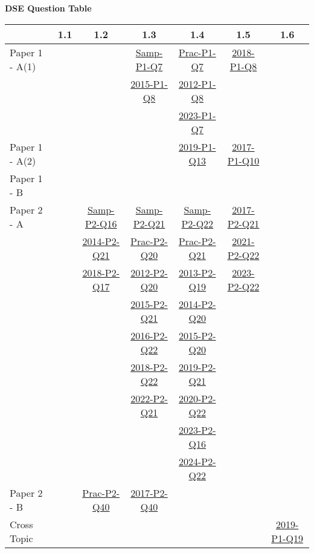 \documentclass[12pt, a4paper]{article}
\begin{document}
\begin{absolutelynopagebreak}
\begin{center}
\textbf{DSE Question Table}
\end{center}
\begin{center}
\begin{tabular}{|l|c|c|c|c|c|c|}
\hline
        & 1.1 & 1.2 & 1.3 & 1.4 & 1.5 & 1.6 \\\hline
\hline
Paper 1 - A(1)&  &  & \hyperref[DSE2012S-CoreP1-Q07]{Samp-P1-Q7} & \hyperref[DSE2012P-CoreP1-Q07]{Prac-P1-Q7} & \hyperref[DSE2018-CoreP1-Q08]{2018-P1-Q8} &  \\
&  &  & \hyperref[DSE2015-CoreP1-Q08]{2015-P1-Q8} & \hyperref[DSE2012-CoreP1-Q08]{2012-P1-Q8} &  &  \\
&  &  &  & \hyperref[DSE2023-CoreP1-Q07]{2023-P1-Q7} &  &  \\
\hline
Paper 1 - A(2)&  &  &  & \hyperref[DSE2019-CoreP1-Q13]{2019-P1-Q13} & \hyperref[DSE2017-CoreP1-Q10]{2017-P1-Q10} &  \\
\hline
Paper 1 - B&  &  &  &  &  &  \\
\hline
\hline
Paper 2 - A&  & \hyperref[DSE2012S-CoreP2-Q16]{Samp-P2-Q16} & \hyperref[DSE2012S-CoreP2-Q21]{Samp-P2-Q21} & \hyperref[DSE2012S-CoreP2-Q22]{Samp-P2-Q22} & \hyperref[DSE2017-CoreP2-Q21]{2017-P2-Q21} &  \\
&  & \hyperref[DSE2014-CoreP2-Q21]{2014-P2-Q21} & \hyperref[DSE2012P-CoreP2-Q20]{Prac-P2-Q20} & \hyperref[DSE2012P-CoreP2-Q21]{Prac-P2-Q21} & \hyperref[DSE2021-CoreP2-Q22]{2021-P2-Q22} &  \\
&  & \hyperref[DSE2018-CoreP2-Q17]{2018-P2-Q17} & \hyperref[DSE2012-CoreP2-Q20]{2012-P2-Q20} & \hyperref[DSE2013-CoreP2-Q19]{2013-P2-Q19} & \hyperref[DSE2023-CoreP2-Q22]{2023-P2-Q22} &  \\
&  &  & \hyperref[DSE2015-CoreP2-Q21]{2015-P2-Q21} & \hyperref[DSE2014-CoreP2-Q20]{2014-P2-Q20} &  &  \\
&  &  & \hyperref[DSE2016-CoreP2-Q22]{2016-P2-Q22} & \hyperref[DSE2015-CoreP2-Q20]{2015-P2-Q20} &  &  \\
&  &  & \hyperref[DSE2018-CoreP2-Q22]{2018-P2-Q22} & \hyperref[DSE2019-CoreP2-Q21]{2019-P2-Q21} &  &  \\
&  &  & \hyperref[DSE2022-CoreP2-Q21]{2022-P2-Q21} & \hyperref[DSE2020-CoreP2-Q22]{2020-P2-Q22} &  &  \\
&  &  &  & \hyperref[DSE2023-CoreP2-Q16]{2023-P2-Q16} &  &  \\
&  &  &  & \hyperref[DSE2024-CoreP2-Q22]{2024-P2-Q22} &  &  \\
\hline
Paper 2 - B&  & \hyperref[DSE2012P-CoreP2-Q40]{Prac-P2-Q40} & \hyperref[DSE2017-CoreP2-Q40]{2017-P2-Q40} &  &  &  \\
\hline
\hline
Cross Topic&  &  &  &  &  & \hyperref[DSE2019-CoreP1-Q19]{2019-P1-Q19} \\
\hline
\end{tabular}
\end{center}
\end{absolutelynopagebreak}
\end{document}
